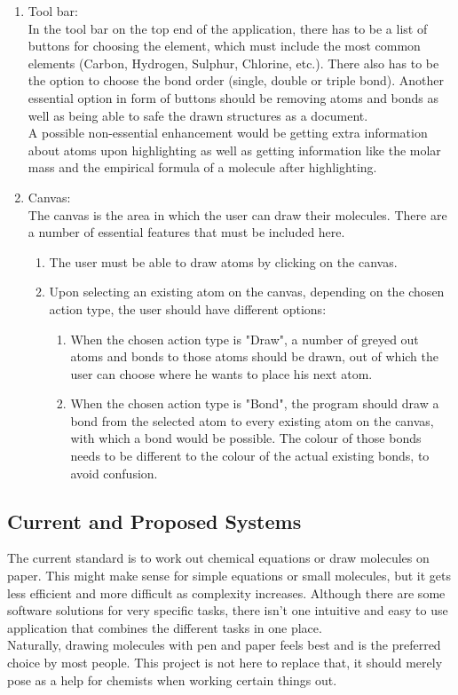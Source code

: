 \documentclass[a4paper,12pt]{article}
\begin{document}
\begin{enumerate}

\item Tool bar:\\
In the tool bar on the top end of the application, there has to be a list of buttons for choosing the element, which must include the most common elements (Carbon, Hydrogen, Sulphur, Chlorine, etc.). There also has to be the option to choose the bond order (single, double or triple bond). Another essential option in form of buttons should be removing atoms and bonds as well as being able to safe the drawn structures as a document.\\
A possible non-essential enhancement would be getting extra information about atoms upon highlighting as well as getting information like the molar mass and the empirical formula of a molecule after highlighting.
\item Canvas:\\
The canvas is the area in which the user can draw their molecules. There are a number of essential features that must be included here.\\
	\begin{enumerate}
	\item The user must be able to draw atoms by clicking on the canvas.
	\item Upon selecting an existing atom on the canvas, depending on the chosen action type, the user should have different options:
		\begin{enumerate}
		\item When the chosen action type is "Draw", a number of greyed out atoms and bonds to those atoms should be drawn, out of which the user can choose where he wants to place his next atom.
		\item When the chosen action type is "Bond", the program should draw a bond from the selected atom to every existing atom on the canvas, with which a bond would be possible. The colour of those bonds needs to be different to the colour of the actual existing 		bonds, to avoid confusion.
		\end{enumerate}
	\end{enumerate}
\end{enumerate}

\subsection{Current and Proposed Systems}

The current standard is to work out chemical equations or draw molecules on paper. This might make sense for simple equations or small molecules, but it gets less efficient and more difficult as complexity increases. Although there are some software solutions for very specific tasks, there isn't one intuitive and easy to use application that combines the different tasks in one place.\\
\linebreak
Naturally, drawing molecules with pen and paper feels best and is the preferred choice by most people. This project is not here to replace that, it should merely pose as a help for chemists when working certain things out.
\end{document}
